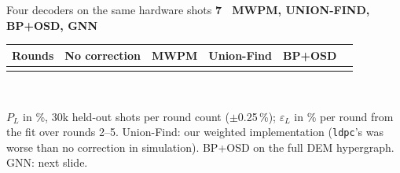 \documentclass[aspectratio=169,11pt]{beamer}
\newcommand{\eyebrow}[1]{{\color{accent}\scriptsize\bfseries\MakeUppercase{#1}}\par\smallskip}
\begin{document}
\begin{frame}{Four decoders on the same hardware shots}
\eyebrow{7 \textperiodcentered\ MWPM, Union-Find, BP+OSD, GNN}
\centering
{\small
\begin{tabular}{@{}l S[table-format=2.1] S[table-format=2.1] S[table-format=2.1] S[table-format=2.1] S[table-format=2.1]@{}}
\toprule
Rounds & {No correction} & {MWPM} & {Union-Find} & {BP+OSD} & {\unskip} \\
\midrule
{}
\bottomrule
\end{tabular}}\\[10pt]
\begin{minipage}{0.92\linewidth}\scriptsize\color{soft}
$P_L$ in \%, 30k held-out shots per round count ($\pm$0.25\,\%); $\varepsilon_L$ in \% per round from the fit over rounds 2--5.
Union-Find: our weighted implementation (\texttt{ldpc}'s was worse than no correction in simulation).
BP+OSD on the full DEM hypergraph. GNN: next slide.
\end{minipage}
\end{frame}
\end{document}

